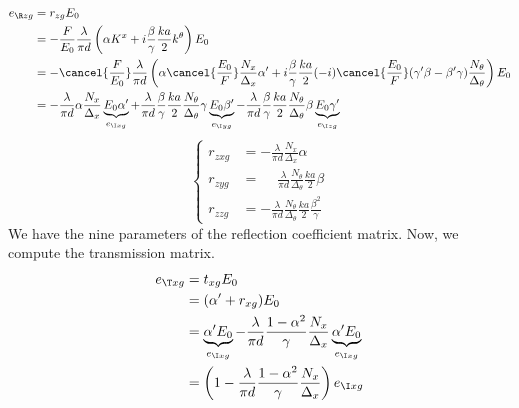 \begin{align*}
    e_{\R zg} &= r_{zg} E_0
    \\
    &=
    -
    \frac{F}{E_0}
    \frac{\lambda}{\pi d}
    \left(
        \alpha K^x
        +
        i
        \frac{\beta}{\gamma}
        \frac{ka}{2}
        k^\theta
    \right)
    E_0
    \\
    &=
    -
    \cancel{\frac{F}{E_0}}
    \frac{\lambda}{\pi d}
    \left(
        \alpha
        \cancel{\frac{E_0}{F}}
        \frac{N_x}{\Delta_x}
        \alpha'
        +
        i
        \frac{\beta}{\gamma}
        \frac{ka}{2}
        (-i)
        \cancel{\frac{E_0}{F}}
        (\gamma' \beta - \beta' \gamma)
        \frac{N_\theta}{\Delta_\theta}
    \right)
    E_0
    \\
    &=
    -
    \frac{\lambda}{\pi d}
    \alpha
    \frac{N_x}{\Delta_x}
    \underbrace{E_0 \alpha'}_{e_{\I xg}}
    +
    \frac{\lambda}{\pi d}
    \frac{\beta}{\gamma}
    \frac{ka}{2}
    \frac{N_\theta}{\Delta_\theta}
    \gamma
    \underbrace{E_0 \beta'}_{e_{\I yg}}
    -
    \frac{\lambda}{\pi d}
    \frac{\beta}{\gamma}
    \frac{ka}{2}
    \frac{N_\theta}{\Delta_\theta}
    \beta
    \underbrace{E_0 \gamma'}_{e_{\I zg}}
\end{align*}
\begin{equation}
    \left\lbrace
    \begin{aligned}
        r_{zxg}
        &=
        -
        \frac{\lambda}{\pi d}
        \frac{N_x}{\Delta_x}
        \alpha
        \\
        r_{zyg}
        &=
        \phantom{-}
        \frac{\lambda}{\pi d}
        \frac{N_\theta}{\Delta_\theta}
        \frac{ka}{2}
        \beta
        \\
        r_{zzg}
        &=
        -
        \frac{\lambda}{\pi d}
        \frac{N_\theta}{\Delta_\theta}
        \frac{ka}{2}
        \frac{\beta^2}{\gamma}
    \end{aligned}
    \right.
\end{equation}
We have the nine parameters of the reflection coefficient matrix.
Now, we compute the transmission matrix.
\begin{align*}
    e_{\T xg} &= t_{xg} E_0
    \\
    &= (\alpha' + r_{xg}) E_0
    \\
    &= \underbrace{\alpha' E_0}_{e_{\I xg}}
       -
       \frac{\lambda}{\pi d}
       \frac{1 - \alpha^2}{\gamma}
       \frac{N_x}{\Delta_x}
       \underbrace{\alpha' E_0}_{e_{\I xg}}
    \\
    &= \left(
           1
           -
           \frac{\lambda}{\pi d}
           \frac{1 - \alpha^2}{\gamma}
           \frac{N_x}{\Delta_x}
       \right)
       e_{\I xg}
\end{align*}
